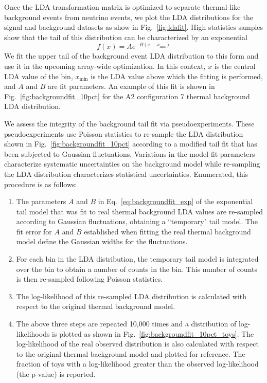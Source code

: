   Once the LDA transformation matrix is optimized to separate thermal-like background events from neutrino events, we plot the LDA distributions for the signal and background datasets as show in Fig.~\ref{fig:ldafit}. 
  High statistics samples show that the tail of this distribution can be characterized by an exponential 
  \begin{equation}
    f(x) = A e^{-B (x-x_{\text{min}})}
    \label{eq:backgroundfit_exp}
  \end{equation}
  We fit the upper tail of the background event LDA distribution to this form and use it in the upcoming array-wide optimization. 
  In this context, $x$ is the central LDA value of the bin, $x_{\text{min}}$ is the LDA value above which the fitting is performed, and $A$ and $B$ are fit parameters. 
  An example of this fit is shown in Fig.~\ref{fig:backgroundfit_10pct} for the A2 configuration 7 thermal background LDA distribution. 

  We assess the integrity of the background tail fit via pseudoexperiments.
  These pseudoexperiments use Poisson statistics to re-sample the LDA distribution shown in Fig.~\ref{fig:backgroundfit_10pct} according to a modified tail fit that has been subjected to Gaussian fluctuations.
  Variations in the model fit parameters characterize systematic uncertainties on the background model while re-sampling the LDA distribution characterizes statistical uncertainties. 
  Enumerated, this procedure is as follows: 
  \begin{enumerate}
    \item The parameters $A$ and $B$ in Eq.~\ref{eq:backgroundfit_exp} of the exponential tail model that was fit to real thermal background LDA values are re-sampled according to Gaussian fluctuations, obtaining a ``temporary" tail model. The fit error for $A$ and $B$ established when fitting the real thermal background model define the Gaussian widths for the fluctuations.
    \item For each bin in the LDA distribution, the temporary tail model is integrated over the bin to obtain a number of counts in the bin. This number of counts is then re-sampled following Poisson statistics.
    \item The log-likelihood of this re-sampled LDA distribution is calculated with respect to the original thermal background model.
    \item The above three steps are repeated 10,000 times and a distribution of log-likelihoods is plotted as shown in Fig.~\ref{fig:backgroundfit_10pct_toys}. The log-likelihood of the real observed distribution is also calculated with respect to the original thermal background model and plotted for reference. The fraction of toys with a log-likelihood greater than the observed log-likelihood (the p-value) is reported. 
  \end{enumerate}

